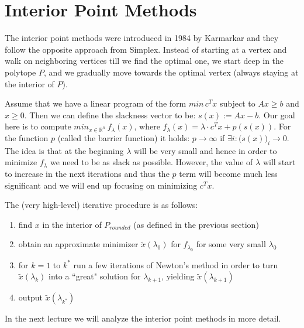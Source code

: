 \documentclass[11pt]{article}
\begin{document}
\section{Interior Point Methods}

The interior point methods were introduced in 1984 by Karmarkar \cite{Karmarkar84} and they follow the opposite approach from Simplex. Instead of starting at a vertex and walk on neighboring vertices till we find the optimal one, we start deep in the polytope $P$, and we gradually move towards the optimal vertex (always staying at the interior of $P$).

Assume that we have a linear program of the form $min\, c^Tx$ subject to $Ax \geq b$ and $x \geq 0$. Then we can define the slackness vector to be: $s(x) := Ax - b$. Our goal here is to compute $min_{x \in \mathbb{R}^n}\,f_\lambda(x)$, where $f_\lambda(x) = \lambda\cdot c^Tx + p(s(x))$. For the function $p$ (called the barrier function) it holds: $p \rightarrow \infty$ if $\exists i: \big(s(x)\big)_i \rightarrow 0$. The idea is that at the beginning $\lambda$ will be very small and hence in order to minimize $f_\lambda$ we need to be as slack as possible. However, the value of $\lambda$ will start to increase in the next iterations and thus the $p$ term will become much less significant and we will end up focusing on minimizing $c^Tx$.

\smallskip
The (very high-level) iterative procedure is as follows:
\vspace{-.2cm}
\begin{enumerate}
\item find $x$ in the interior of $P_{rounded}$ (as defined in the previous section)
\item obtain an approximate minimizer $\widetilde{x}(\lambda_0)$ for $f_{\lambda_0}$ for some very small $\lambda_0$
\item for $k=1$ to $k^{*}$ run a few iterations of Newton's method in order to turn $\widetilde{x}(\lambda_k)$ into a ``great" solution for $\lambda_{k+1}$, yielding $\widetilde{x}(\lambda_{k+1})$
\item output $\widetilde{x}(\lambda_{k^{*}})$
\end{enumerate}

In the next lecture we will analyze the interior point methods in more detail.
\end{document}
